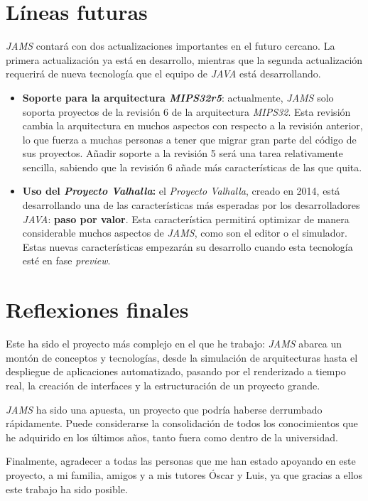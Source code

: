 \section{Líneas futuras}\label{sec:líneas-futuras}

\textit{JAMS} contará con dos actualizaciones importantes en el
futuro cercano.
La primera actualización ya está en desarrollo, mientras que la
segunda actualización requerirá de nueva tecnología que
el equipo de \textit{JAVA} está desarrollando.
\begin{itemize}
    \item \textbf{Soporte para la arquitectura \textit{MIPS32r5}}:
    actualmente, \textit{JAMS} solo soporta proyectos de la revisión 6
    de la arquitectura \textit{MIPS32}.
    Esta revisión cambia la arquitectura en muchos aspectos con respecto
    a la revisión anterior, lo que fuerza a muchas personas a tener
    que migrar gran parte del código de sus proyectos.
    Añadir soporte a la revisión 5 será una tarea relativamente sencilla,
    sabiendo que la revisión 6 añade más características de las que quita.
    \item \textbf{Uso del \textit{Proyecto Valhalla}:} el
    \textit{Proyecto Valhalla}\cite{PROJECT_VALHALLA}, creado en 2014,
    está desarrollando una de las características más esperadas
    por los desarrolladores \textit{JAVA}: \textbf{paso por valor}.
    Esta característica permitirá optimizar de manera considerable
    muchos aspectos de \textit{JAMS}, como son el editor o el simulador.
    Estas nuevas características empezarán su desarrollo cuando esta
    tecnología esté en fase \textit{preview}.
\end{itemize}

\section{Reflexiones finales}\label{sec:reflexiones-finales}

Este ha sido el proyecto más complejo en el que he trabajo:
\textit{JAMS} abarca un montón de conceptos y tecnologías,
desde la simulación de arquitecturas hasta el despliegue de
aplicaciones automatizado, pasando por el renderizado a tiempo
real, la creación de interfaces y la estructuración de un
proyecto grande.

\noindent \textit{JAMS} ha sido una apuesta, un proyecto
que podría haberse derrumbado rápidamente.
Puede considerarse la consolidación de todos los conocimientos
que he adquirido en los últimos años, tanto fuera como dentro
de la universidad.

\noindent Finalmente, agradecer a todas las personas que me han
estado apoyando en este proyecto, a mi familia, amigos y a mis
tutores Óscar y Luis, ya que gracias a ellos este trabajo
ha sido posible.